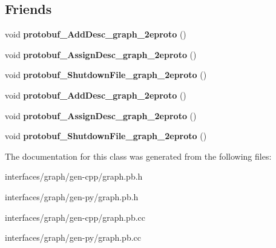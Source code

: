 \subsection*{Friends}
\begin{DoxyCompactItemize}
\item 
\hypertarget{classgraph_1_1Graph_a3216c708da10839178deebea43d6f0be}{
void {\bfseries protobuf\_\-AddDesc\_\-graph\_\-2eproto} ()}
\label{classgraph_1_1Graph_a3216c708da10839178deebea43d6f0be}

\item 
\hypertarget{classgraph_1_1Graph_a4c9d7eb8f9e30e490c8bcae70e629de5}{
void {\bfseries protobuf\_\-AssignDesc\_\-graph\_\-2eproto} ()}
\label{classgraph_1_1Graph_a4c9d7eb8f9e30e490c8bcae70e629de5}

\item 
\hypertarget{classgraph_1_1Graph_aac10332314561225d8ac09b797223f3d}{
void {\bfseries protobuf\_\-ShutdownFile\_\-graph\_\-2eproto} ()}
\label{classgraph_1_1Graph_aac10332314561225d8ac09b797223f3d}

\item 
\hypertarget{classgraph_1_1Graph_a3216c708da10839178deebea43d6f0be}{
void {\bfseries protobuf\_\-AddDesc\_\-graph\_\-2eproto} ()}
\label{classgraph_1_1Graph_a3216c708da10839178deebea43d6f0be}

\item 
\hypertarget{classgraph_1_1Graph_a4c9d7eb8f9e30e490c8bcae70e629de5}{
void {\bfseries protobuf\_\-AssignDesc\_\-graph\_\-2eproto} ()}
\label{classgraph_1_1Graph_a4c9d7eb8f9e30e490c8bcae70e629de5}

\item 
\hypertarget{classgraph_1_1Graph_aac10332314561225d8ac09b797223f3d}{
void {\bfseries protobuf\_\-ShutdownFile\_\-graph\_\-2eproto} ()}
\label{classgraph_1_1Graph_aac10332314561225d8ac09b797223f3d}

\end{DoxyCompactItemize}


The documentation for this class was generated from the following files:\begin{DoxyCompactItemize}
\item 
interfaces/graph/gen-\/cpp/graph.pb.h\item 
interfaces/graph/gen-\/py/graph.pb.h\item 
interfaces/graph/gen-\/cpp/graph.pb.cc\item 
interfaces/graph/gen-\/py/graph.pb.cc\end{DoxyCompactItemize}
